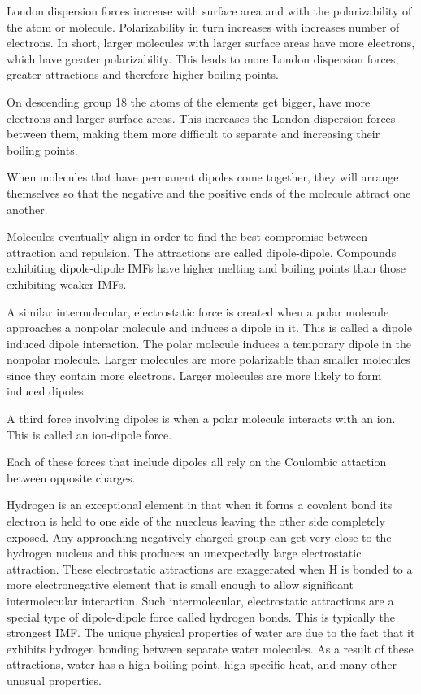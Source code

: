 \documentclass[../chem.tex]{subfiles}
\begin{document}
London dispersion forces increase with surface area and with the polarizability of the atom or molecule. Polarizability in turn increases 
with increases number of electrons. In short, larger molecules with larger surface areas have more electrons, which have greater polarizability.
This leads to more London dispersion forces, greater attractions and therefore higher boiling points. 

On descending group 18 the atoms of the elements get bigger, have more electrons and larger surface areas. This increases the London 
dispersion forces between them, making them more difficult to separate and increasing their boiling points. 

When molecules that have permanent dipoles come together, they will arrange themselves so that the negative and the positive ends of the molecule attract one another.

Molecules eventually align in order to find the best compromise between attraction and repulsion. The attractions are called dipole-dipole.
Compounds exhibiting dipole-dipole IMFs have higher melting and boiling points than those exhibiting weaker IMFs.

A similar intermolecular, electrostatic force is created when a polar molecule approaches a nonpolar molecule and induces a dipole in it. 
This is called a dipole induced dipole interaction. The polar molecule induces a temporary dipole in the nonpolar molecule. Larger molecules are more polarizable 
than smaller molecules since they contain more electrons. Larger molecules are more likely to form induced dipoles.

A third force involving dipoles is when a polar molecule interacts with an ion. This is called an ion-dipole force.

Each of these forces that include dipoles all rely on the Coulombic attaction between opposite charges.

Hydrogen is an exceptional element in that when it forms a covalent bond its electron is held to one side of the nuecleus leaving the other side 
completely exposed. Any approaching negatively charged group can get very close to the hydrogen nucleus and this produces an unexpectedly large 
electrostatic attraction. These electrostatic attractions are exaggerated when H is bonded to a more electronegative element that is small enough to 
allow significant intermolecular interaction. Such intermolecular, electrostatic attractions are a special type of dipole-dipole force called hydrogen 
bonds. This is typically the strongest IMF. The unique physical properties of water are due to the fact that it exhibits hydrogen bonding 
between separate water molecules. As a result of these attractions, water has a high boiling point, high specific heat, and many other unusual properties.
\end{document}
